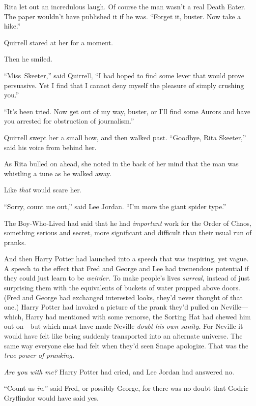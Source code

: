 Rita let out an incredulous laugh. Of course the man wasn’t a real Death Eater. The paper wouldn’t have published it if he was. “Forget it, buster. Now take a hike.”

Quirrell stared at her for a moment.

Then he smiled.

“Miss~Skeeter,” said Quirrell, “I had hoped to find some lever that would prove persuasive. Yet I find that I cannot deny myself the pleasure of simply crushing you.”

“It’s been tried. Now get out of my way, buster, or I’ll find some Aurors and have you arrested for obstruction of journalism.”

Quirrell swept her a small bow, and then walked past. “Goodbye, Rita Skeeter,” said his voice from behind her.

As Rita bulled on ahead, she noted in the back of her mind that the man was whistling a tune as he walked away.

Like \emph{that} would scare her.


“Sorry, count me out,” said Lee Jordan. “I’m more the giant spider type.”

The Boy-Who-Lived had said that he had \emph{important} work for the Order of Chaos, something serious and secret, more significant and difficult than their usual run of pranks.

And then Harry Potter had launched into a speech that was inspiring, yet vague. A speech to the effect that Fred and George and Lee had tremendous potential if they could just learn to be \emph{weirder.} To make people’s lives \emph{surreal,} instead of just surprising them with the equivalents of buckets of water propped above doors. (Fred and George had exchanged interested looks, they’d never thought of that one.) Harry Potter had invoked a picture of the prank they’d pulled on Neville—which, Harry had mentioned with some remorse, the Sorting Hat had chewed him out on—but which must have made Neville \emph{doubt his own sanity.} For Neville it would have felt like being suddenly transported into an alternate universe. The same way everyone else had felt when they’d seen Snape apologize. That was the \emph{true power of pranking.}

\emph{Are you with me?} Harry Potter had cried, and Lee Jordan had answered no.

“Count us \emph{in},” said Fred, or possibly George, for there was no doubt that Godric Gryffindor would have said yes.

